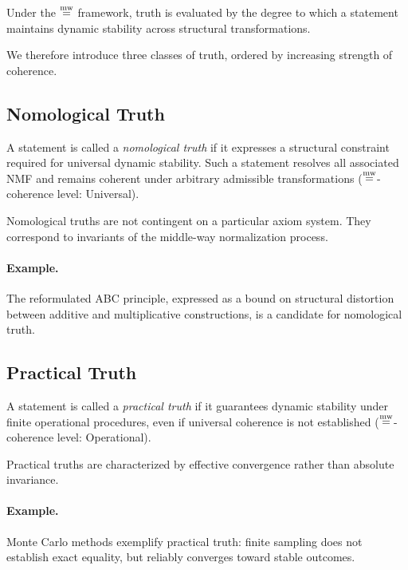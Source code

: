 \documentclass[11pt]{article}
\begin{document}
Under the $\mathrel{\overset{\mathrm{mw}}{=}}$ framework, truth is evaluated by the degree to which a
statement maintains dynamic stability across structural transformations.

We therefore introduce three classes of truth, ordered by increasing
strength of coherence.

\subsection{Nomological Truth}

\begin{definition}
A statement is called a \emph{nomological truth} if it expresses a
structural constraint required for universal dynamic stability.
Such a statement resolves all associated NMF and remains coherent
under arbitrary admissible transformations ($\mathrel{\overset{\mathrm{mw}}{=}}$-coherence level: Universal).
\end{definition}

Nomological truths are not contingent on a particular axiom system.
They correspond to invariants of the middle-way normalization process.

\paragraph{Example.}
The reformulated ABC principle, expressed as a bound on structural
distortion between additive and multiplicative constructions, is a
candidate for nomological truth.

\subsection{Practical Truth}

\begin{definition}
A statement is called a \emph{practical truth} if it guarantees dynamic
stability under finite operational procedures, even if universal
coherence is not established ($\mathrel{\overset{\mathrm{mw}}{=}}$-coherence level: Operational).
\end{definition}

Practical truths are characterized by effective convergence rather
than absolute invariance.

\paragraph{Example.}
Monte Carlo methods exemplify practical truth: finite sampling does not
establish exact equality, but reliably converges toward stable outcomes.
\end{document}
